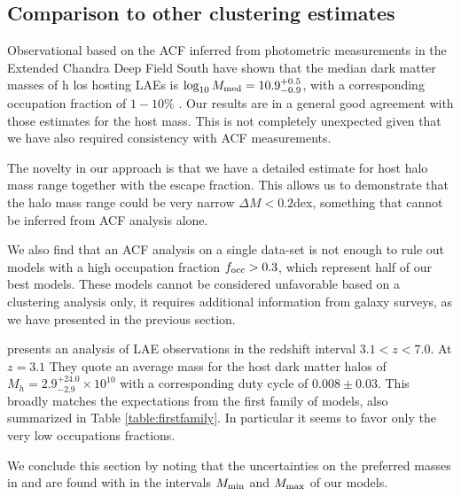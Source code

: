 \documentclass[usenatbib]{mn2e}
\newcommand{\hMsun}{{\ifmmode{h^{-1}{\rm
        {M_{\odot}}}}\else{$h^{-1}{\rm{M_{\odot}}}$}\fi}}
\newcommand{\Msun}{{\ifmmode{{\rm {M_{\odot}}}}\else{${\rm{M_{\odot}}}$}\fi}}
\begin{document}
\subsection{Comparison to other clustering estimates}

Observational based on the ACF inferred from photometric measurements
in the Extended Chandra Deep Field South have shown that the median
dark matter masses of h los hosting LAEs is $\log_{10}M_{\rm
  med}=10.9^{+0.5}_{-0.9}$\Msun, with a corresponding occupation
fraction of $1-10\%$  \citep{Gawiser07}.  Our results are in a general
good agreement with those estimates for the host mass. This is not
completely unexpected given that we have also required consistency
with ACF measurements.   

The novelty in our approach is that we have a detailed estimate for 
host halo mass range together with the escape fraction. This allows us
to demonstrate that the halo mass range could be very narrow $\Delta M <
0.2$dex, something that cannot be inferred from ACF analysis alone. 

We also find that an ACF analysis on a single data-set is not enough to rule
out models with a high occupation fraction $f_{\rm occ}>0.3$, which
represent half of our best models. These models cannot be
considered unfavorable based on a clustering analysis only, it
requires additional information from galaxy surveys, as we have
presented in the previous section.

\cite{Ouchi2010} presents an analysis of LAE observations in the
redshift interval $3.1<z<7.0$. At $z=3.1$ They quote an average
mass for the host dark matter halos of $M_{h}=2.9^{+24.0}_{-2.9}\times
10^{10}$ \hMsun with a corresponding duty cycle of $0.008\pm
0.03$.  This broadly matches the expectations from the first family of
models, also summarized in Table \ref{table:firstfamily}. In
particular it seems to favor only the very low occupations
fractions. 

We conclude this section by noting that the uncertainties on
the preferred masses in \citep{Gawiser07} and \cite{Ouchi2010} are
found with in the intervals $M_{\rm min}$ and $M_{\rm max}$ of our
models. 
\end{document}
